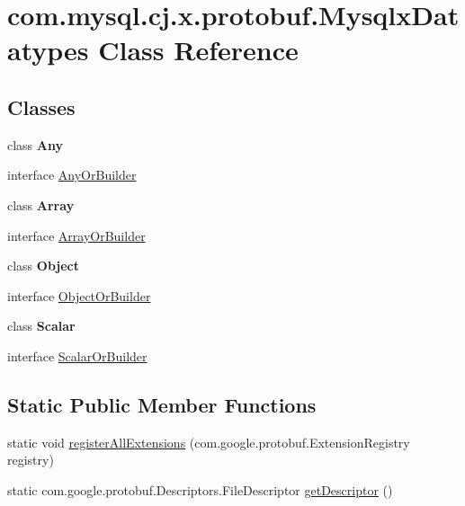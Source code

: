 \hypertarget{classcom_1_1mysql_1_1cj_1_1x_1_1protobuf_1_1_mysqlx_datatypes}{}\section{com.\+mysql.\+cj.\+x.\+protobuf.\+Mysqlx\+Datatypes Class Reference}
\label{classcom_1_1mysql_1_1cj_1_1x_1_1protobuf_1_1_mysqlx_datatypes}
\subsection*{Classes}
\begin{DoxyCompactItemize}
\item 
class {\bfseries Any}
\item 
interface \mbox{\hyperlink{interfacecom_1_1mysql_1_1cj_1_1x_1_1protobuf_1_1_mysqlx_datatypes_1_1_any_or_builder}{Any\+Or\+Builder}}
\item 
class {\bfseries Array}
\item 
interface \mbox{\hyperlink{interfacecom_1_1mysql_1_1cj_1_1x_1_1protobuf_1_1_mysqlx_datatypes_1_1_array_or_builder}{Array\+Or\+Builder}}
\item 
class {\bfseries Object}
\item 
interface \mbox{\hyperlink{interfacecom_1_1mysql_1_1cj_1_1x_1_1protobuf_1_1_mysqlx_datatypes_1_1_object_or_builder}{Object\+Or\+Builder}}
\item 
class {\bfseries Scalar}
\item 
interface \mbox{\hyperlink{interfacecom_1_1mysql_1_1cj_1_1x_1_1protobuf_1_1_mysqlx_datatypes_1_1_scalar_or_builder}{Scalar\+Or\+Builder}}
\end{DoxyCompactItemize}
\subsection*{Static Public Member Functions}
\begin{DoxyCompactItemize}
\item 
static void \mbox{\hyperlink{classcom_1_1mysql_1_1cj_1_1x_1_1protobuf_1_1_mysqlx_datatypes_a4b4a0b953acb8d94afb3b9a0ae9c1562}{register\+All\+Extensions}} (com.\+google.\+protobuf.\+Extension\+Registry registry)
\item 
static com.\+google.\+protobuf.\+Descriptors.\+File\+Descriptor \mbox{\hyperlink{classcom_1_1mysql_1_1cj_1_1x_1_1protobuf_1_1_mysqlx_datatypes_a263040bb1e6f22af44716ceef6571fba}{get\+Descriptor}} ()
\end{DoxyCompactItemize}


